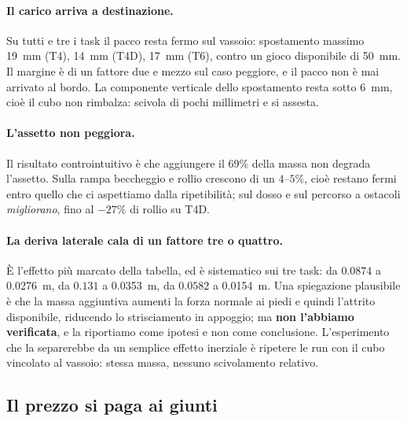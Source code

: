 \paragraph{Il carico arriva a destinazione.} Su tutti e tre i task il pacco
resta fermo sul vassoio: spostamento massimo \SI{19}{\milli\meter} (T4),
\SI{14}{\milli\meter} (T4D), \SI{17}{\milli\meter} (T6), contro un gioco
disponibile di \SI{50}{\milli\meter}. Il margine è di un fattore due e mezzo
sul caso peggiore, e il pacco non è mai arrivato al bordo. La componente
verticale dello spostamento resta sotto \SI{6}{\milli\meter}, cioè il cubo non
rimbalza: scivola di pochi millimetri e si assesta.

\paragraph{L'assetto non peggiora.} Il risultato controintuitivo è che
aggiungere il 69\% della massa non degrada l'assetto. Sulla rampa beccheggio e
rollio crescono di un $4$--$5\%$, cioè restano fermi entro quello che ci
aspettiamo dalla ripetibilità; sul dosso e sul percorso a ostacoli
\emph{migliorano}, fino al $-27\%$ di rollio su T4D.

\paragraph{La deriva laterale cala di un fattore tre o quattro.} È l'effetto
più marcato della tabella, ed è sistematico sui tre task: da $0.0874$ a
\SI{0.0276}{\meter}, da $0.131$ a \SI{0.0353}{\meter}, da $0.0582$ a
\SI{0.0154}{\meter}. Una spiegazione plausibile è che la massa aggiuntiva
aumenti la forza normale ai piedi e quindi l'attrito disponibile, riducendo lo
strisciamento in appoggio; ma \textbf{non l'abbiamo verificata}, e la
riportiamo come ipotesi e non come conclusione. L'esperimento che la
separerebbe da un semplice effetto inerziale è ripetere le run con il cubo
vincolato al vassoio: stessa massa, nessuno scivolamento relativo.


\subsection{Il prezzo si paga ai giunti}

